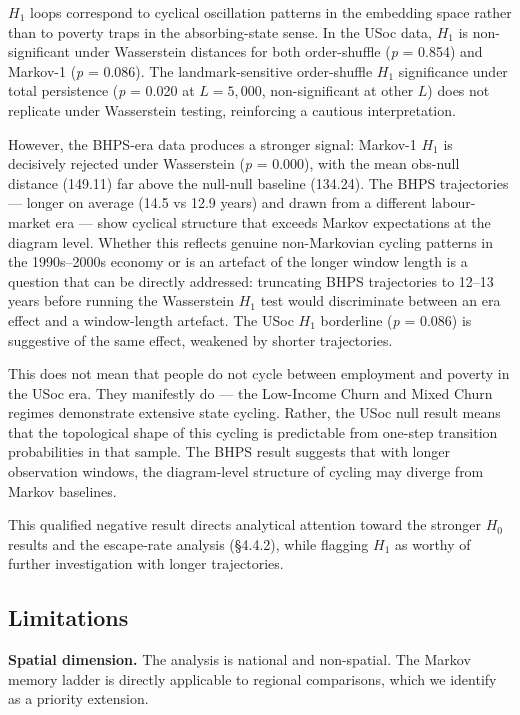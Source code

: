 $H_1$ loops correspond to cyclical oscillation patterns in the embedding space rather than to poverty traps in the absorbing-state sense. In the USoc data, $H_1$ is non-significant under Wasserstein distances for both order-shuffle (\textit{p} = 0.854) and Markov-1 (\textit{p} = 0.086). The landmark-sensitive order-shuffle $H_1$ significance under total persistence (\textit{p} = 0.020 at $L = 5{,}000$, non-significant at other $L$) does not replicate under Wasserstein testing, reinforcing a cautious interpretation.

However, the BHPS-era data produces a stronger signal: Markov-1 $H_1$ is decisively rejected under Wasserstein (\textit{p} = 0.000), with the mean obs-null distance (149.11) far above the null-null baseline (134.24). The BHPS trajectories --- longer on average (14.5 vs 12.9 years) and drawn from a different labour-market era --- show cyclical structure that exceeds Markov expectations at the diagram level. Whether this reflects genuine non-Markovian cycling patterns in the 1990s--2000s economy or is an artefact of the longer window length is a question that can be directly addressed: truncating BHPS trajectories to 12--13 years before running the Wasserstein $H_1$ test would discriminate between an era effect and a window-length artefact. The USoc $H_1$ borderline (\textit{p} = 0.086) is suggestive of the same effect, weakened by shorter trajectories.

This does not mean that people do not cycle between employment and poverty in the USoc era. They manifestly do --- the Low-Income Churn and Mixed Churn regimes demonstrate extensive state cycling. Rather, the USoc null result means that the topological shape of this cycling is predictable from one-step transition probabilities in that sample. The BHPS result suggests that with longer observation windows, the diagram-level structure of cycling may diverge from Markov baselines.

This qualified negative result directs analytical attention toward the stronger $H_0$ results and the escape-rate analysis (\S4.4.2), while flagging $H_1$ as worthy of further investigation with longer trajectories.

\subsection{Limitations}

\textbf{Spatial dimension.} The analysis is national and non-spatial. The Markov memory ladder is directly applicable to regional comparisons, which we identify as a priority extension.

